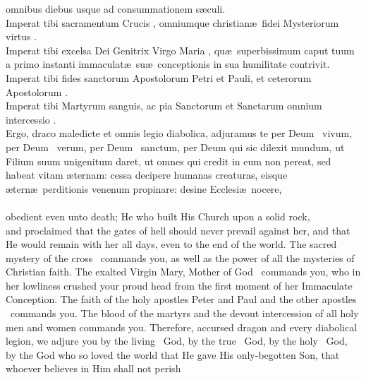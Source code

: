 \begin{multicols}{2}
\noindent
omnibus diebus usque ad consummationem s\ae culi.\\ Imperat tibi sacramentum Crucis \grecross, omniumque christian\ae \ fidei Mysteriorum virtus \grecross.\\
Imperat tibi excelsa Dei Genitrix Virgo Maria \grecross, qu\ae \ superbissimum caput tuum a primo instanti immaculat\ae \ su\ae \ conceptionis in sua humilitate contrivit.\\ Imperat tibi fides sanctorum Apostolorum Petri et Pauli, et ceterorum Apostolorum \grecross.\\ Imperat tibi Martyrum sanguis, ac pia Sanctorum et Sanctarum omnium intercessio \grecross.\\ Ergo, draco maledicte et omnis legio diabolica, adjuramus te per Deum \grecross~vivum, per Deum \grecross~verum, per Deum \grecross~sanctum, per Deum qui sic dilexit mundum, ut Filium suum unigenitum daret, ut omnes qui credit in eum non pereat, sed habeat vitam \ae ternam: cessa decipere humanas creaturas, eisque \ae tern\ae\  perditionis venenum propinare: desine Ecclesi\ae \ nocere,\\
\\
obedient even unto death; 
He who built His Church upon a solid rock, \\
and proclaimed that the gates of hell should never prevail against her, and that He would remain with her all days, even to the end of the world. The sacred mystery of the cross \grecross~commands you, as well as the power of all the mysteries of Christian faith. The exalted Virgin Mary, Mother of God \grecross~commands you, who in her lowliness crushed your proud head from the first moment of her Immaculate Conception. The faith of the holy apostles Peter and Paul and the other apostles \grecross~commands you. The blood of the martyrs and the devout intercession of all holy men and women commands you. Therefore, accursed dragon and every diabolical legion, we adjure you by the living \grecross~God, by the true \grecross~God, by the holy \grecross~God, by the God who so loved the world that He gave His only-begotten Son, that whoever believes in Him shall not perish\\
\end{multicols}
